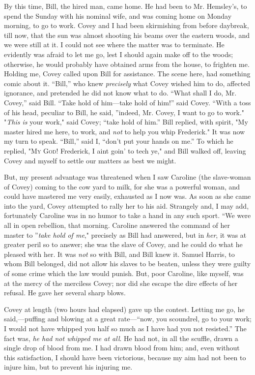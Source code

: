 By this time, Bill, the hired man, came home. He had been to Mr.
Hemsley's, to spend the Sunday with his nominal wife, and was coming
home on Monday morning, to go to work. Covey and I had been skirmishing
from before daybreak, till now, that the sun was almost shooting his
beams over the eastern woods, and we were still at it. I could not see
where the matter was to terminate. He evidently was afraid to let me go,
lest I should again make off to the woods; otherwise, he would probably
have obtained arms from the house, to frighten me. Holding me, Covey
called upon Bill for assistance. The scene here, had something comic
about it. ``Bill,'' who knew \emph{precisely} {}what Covey wished him to
do, affected ignorance, and pretended he did not know what to do. ``What
shall I do, Mr. Covey,'' said Bill. ``Take hold of him---take hold of
him!'' said Covey. ``With a toss of his head, peculiar to Bill, he said,
''indeed, Mr. Covey, I want to go to work." "\emph{This is} your work,"
said Covey; ``take hold of him.'' Bill replied, with spirit, "My master
hired me here, to work, and \emph{not} to help you whip Frederick." It
was now my turn to speak. ``Bill,'' said I, ``don't put your hands on
me.'' To which he replied, "\textsc{My God}! Frederick, I aint goin' to
tech ye," and Bill walked off, leaving Covey and myself to settle our
matters as best we might.

But, my present advantage was threatened when I saw Caroline (the
slave-woman of Covey) coming to the cow yard to milk, for she was a
powerful woman, and could have mastered me very easily, exhausted as I
now was. As soon as she came into the yard, Covey attempted to rally her
to his aid. Strangely and, I may add, fortunately Caroline was in no
humor to take a hand in any such sport. ``We were all in open rebellion,
that morning. Caroline answered the command of her master to
''\emph{take hold of me}," precisely as Bill had answered, but in
\emph{her}, it was at greater peril so to answer; she was the slave of
Covey, and he could do what he pleased with her. It was \emph{not} so
with Bill, and Bill knew it. Samuel Harris, to whom Bill belonged, did
not allow his slaves to be beaten, unless they were guilty of some crime
which the law would punish. But, poor Caroline, like myself, was at the
mercy of the merciless Covey; nor {}did she escape the dire effects of
her refusal. He gave her several sharp blows.

Covey at length (two hours had elapsed) gave up the contest. Letting me
go, he said,---puffing and blowing at a great rate---``now, you
scoundrel, go to your work; I would not have whipped you half so much as
I have had you not resisted.'' The fact was, \emph{he had not whipped me
at all}. He had not, in all the scuffle, drawn a single drop of blood
from me. I had drawn blood from him; and, even without this
satisfaction, I should have been victorious, because my aim had not been
to injure him, but to prevent his injuring me.

